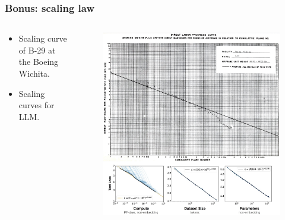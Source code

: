\documentclass{beamer}
\begin{document}
\begin{frame}
    
\frametitle{Bonus: scaling law}
\begin{columns}
\begin{column}{0.3\textwidth}
\begin{itemize}
    \item Scaling curve of B-29 at the Boeing Wichita.
    \item Scaling curves for LLM. \cite{kaplanScalingLawsNeural2020}
\end{itemize}
\end{column}
\begin{column}{0.7\textwidth}
    \begin{figure}[t]
        \includegraphics[width=\textwidth]{figure/bonus_scaling_plot_then_and_now.jpg}
        \centering
    \end{figure}
\end{column}
\end{columns}
\end{frame}
\end{document}
